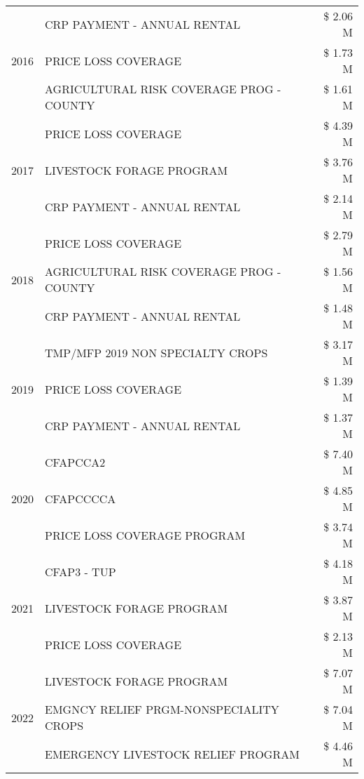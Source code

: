 \begin{tabular}{llr}
\cline{1-3}
\multirow[t]{3}{*}{2016} & CRP PAYMENT - ANNUAL RENTAL & \$ 2.06 M \\
 & PRICE LOSS COVERAGE & \$ 1.73 M \\
 & AGRICULTURAL RISK COVERAGE PROG - COUNTY & \$ 1.61 M \\
\cline{1-3}
\multirow[t]{3}{*}{2017} & PRICE LOSS COVERAGE & \$ 4.39 M \\
 & LIVESTOCK FORAGE PROGRAM & \$ 3.76 M \\
 & CRP PAYMENT - ANNUAL RENTAL & \$ 2.14 M \\
\cline{1-3}
\multirow[t]{3}{*}{2018} & PRICE LOSS COVERAGE & \$ 2.79 M \\
 & AGRICULTURAL RISK COVERAGE PROG - COUNTY & \$ 1.56 M \\
 & CRP PAYMENT - ANNUAL RENTAL & \$ 1.48 M \\
\cline{1-3}
\multirow[t]{3}{*}{2019} & TMP/MFP 2019 NON SPECIALTY CROPS & \$ 3.17 M \\
 & PRICE LOSS COVERAGE & \$ 1.39 M \\
 & CRP PAYMENT - ANNUAL RENTAL & \$ 1.37 M \\
\cline{1-3}
\multirow[t]{3}{*}{2020} & CFAPCCA2 & \$ 7.40 M \\
 & CFAPCCCCA & \$ 4.85 M \\
 & PRICE LOSS COVERAGE PROGRAM & \$ 3.74 M \\
\cline{1-3}
\multirow[t]{3}{*}{2021} & CFAP3 - TUP & \$ 4.18 M \\
 & LIVESTOCK FORAGE PROGRAM & \$ 3.87 M \\
 & PRICE LOSS COVERAGE & \$ 2.13 M \\
\cline{1-3}
\multirow[t]{3}{*}{2022} & LIVESTOCK FORAGE PROGRAM & \$ 7.07 M \\
 & EMGNCY RELIEF PRGM-NONSPECIALITY CROPS & \$ 7.04 M \\
 & EMERGENCY LIVESTOCK RELIEF PROGRAM & \$ 4.46 M \\
\cline{1-3}
\bottomrule
\end{tabular}
